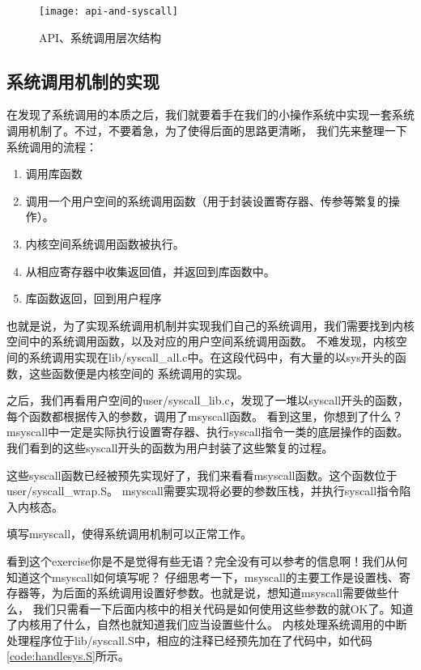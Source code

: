 \begin{figure}[htbp]
  \centering
  \texttt{[image: api-and-syscall]}
  \caption{API、系统调用层次结构}\label{fig:api-and-syscall}
\end{figure}

\subsection{系统调用机制的实现}
在发现了系统调用的本质之后，我们就要着手在我们的小操作系统中实现一套系统调用机制了。不过，不要着急，为了使得后面的思路更清晰，
我们先来整理一下系统调用的流程：
\begin{enumerate}
  \item 调用库函数
  \item 调用一个用户空间的系统调用函数（用于封装设置寄存器、传参等繁复的操作）。
  \item 内核空间系统调用函数被执行。
  \item 从相应寄存器中收集返回值，并返回到库函数中。
  \item 库函数返回，回到用户程序
\end{enumerate}

也就是说，为了实现系统调用机制并实现我们自己的系统调用，我们需要找到内核空间中的系统调用函数，以及对应的用户空间系统调用函数。
不难发现，内核空间的系统调用实现在lib/syscall\_all.c中。在这段代码中，有大量的以sys开头的函数，这些函数便是内核空间的
系统调用的实现。

之后，我们再看用户空间的user/syscall\_lib.c，发现了一堆以syscall开头的函数，每个函数都根据传入的参数，调用了msyscall函数。
看到这里，你想到了什么？msyscall中一定是实际执行设置寄存器、执行syscall指令一类的底层操作的函数。
我们看到的这些syscall开头的函数为用户封装了这些繁复的过程。

这些syscall函数已经被预先实现好了，我们来看看msyscall函数。这个函数位于user/syscall\_wrap.S。
msyscall需要实现将必要的参数压栈，并执行syscall指令陷入内核态。

\begin{exercise}
填写msyscall，使得系统调用机制可以正常工作。
\end{exercise}

看到这个exercise你是不是觉得有些无语？完全没有可以参考的信息啊！我们从何知道这个msyscall如何填写呢？
仔细思考一下，msyscall的主要工作是设置栈、寄存器等，为后面的系统调用设置好参数。也就是说，想知道msyscall需要做些什么，
我们只需看一下后面内核中的相关代码是如何使用这些参数的就OK了。知道了内核用了什么，自然也就知道我们应当设置些什么。
内核处理系统调用的中断处理程序位于lib/syscall.S中，相应的注释已经预先加在了代码中，如代码\ref{code:handlesys.S}所示。

